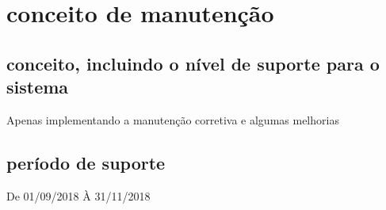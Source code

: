 \chapter{conceito de manutenção}

\section{conceito, incluindo o nível de suporte para o sistema }
Apenas implementando a manutenção corretiva e algumas melhorias
\section{período de suporte}
De 01/09/2018 À 31/11/2018
